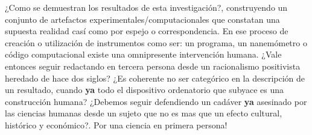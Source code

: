¿Como se demuestran los resultados de esta investigación?, construyendo un conjunto de artefactos experimentales/computacionales que constatan una supuesta realidad casí como por espejo o correspondencia. En ese proceso de creación o utilización de instrumentos como ser: un programa, un nanemómetro o código computacional existe una omnipresente intervención humana. ¿Vale entonces seguir redactando en tercera persona desde un racionalismo positivista heredado de hace dos siglos? ¿Es coherente no ser categórico en la descripción de un resultado, cuando \textbf{ya} todo el dispositivo ordenatorio que subyace es una construcción humana? ¿Debemos seguir defendiendo un cadáver \textbf{ya} asesinado por las ciencias humanas desde un sujeto que no es mas que un efecto cultural, histórico y económico?. Por una ciencia en primera persona! 


